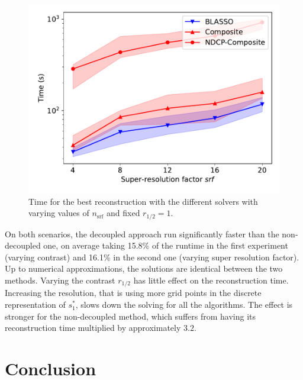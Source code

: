 \documentclass[12pt]{article}
\begin{document}
        \begin{figure}[t]
            \centering
            \includegraphics[width=.7\linewidth]{figures/benchmark/time_vs_srf.pdf}        
            \caption{Time for the best reconstruction with the different solvers with varying values of $n_\mathrm{srf}$ and fixed $r_{1/2}=1$.}
            \label{fig:time-vs-srf}
        \end{figure}
    
        On both scenarios, the decoupled approach run significantly faster than the non-decoupled one, on average taking 15.8\% of the runtime in the first experiment (varying contrast) and 16.1\% in the second one (varying super resolution factor). Up to numerical approximations, the solutions are identical between the two methods.
        Varying the contrast $r_{1/2}$ has little effect on the reconstruction time. Increasing the resolution, that is using more grid points in the discrete representation of $s_1^*$, slows down the solving for all the algorithms. The effect is stronger for the non-decoupled method, which suffers from having its reconstruction time multiplied by approximately $3.2$.

        

\section{Conclusion}

\end{document}
